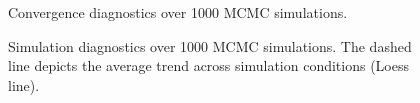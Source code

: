 \documentclass[article]{jss}
\begin{document}
\begin{figure}[h]
  \caption{Convergence diagnostics over 1000 MCMC simulations.}
    \label{fig:conv}
\end{figure}


\begin{figure}[h]
  \caption{Simulation diagnostics over 1000 MCMC simulations. The dashed line depicts the average trend across simulation conditions (Loess line).}
    \label{fig:sim}
\end{figure}
\end{document}
